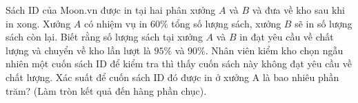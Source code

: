 \begin{ex}%
	Sách ID của Moon.vn được in tại hai phân xưởng $A$ và $B$ và đưa về kho sau khi in xong. Xưởng $A$ có nhiệm vụ in $60\%$ tổng số lượng sách, xưởng $B$ sẽ in số lượng sách còn lại. Biết rằng số lượng sách tại xưởng $A$ và $B$ in đạt yêu cầu về chất lượng và chuyển về kho lần lượt là $95\%$ và $90\%$. Nhân viên kiểm kho chọn ngẫu nhiên một cuốn sách ID để kiểm tra thì thấy cuốn sách này không đạt yêu cầu về chất lượng. Xác suất để cuốn sách ID đó được in ở xưởng A là bao nhiêu phần trăm? (Làm tròn kết quả đến hàng phần chục).
\end{ex}

%

